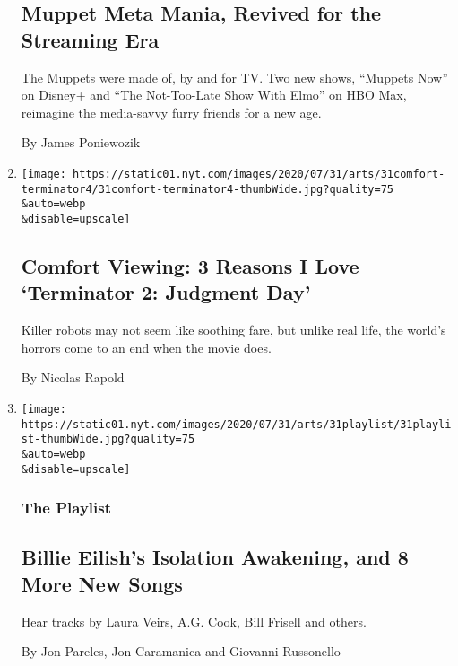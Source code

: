 \begin{enumerate}
  \hypertarget{muppet-meta-mania-revived-for-the-streaming-era}{%
  \subsection{Muppet Meta Mania, Revived for the Streaming
  Era}\label{muppet-meta-mania-revived-for-the-streaming-era}}

  The Muppets were made of, by and for TV. Two new shows, ``Muppets
  Now'' on Disney+ and ``The Not-Too-Late Show With Elmo'' on HBO Max,
  reimagine the media-savvy furry friends for a new age.

  By James Poniewozik
\item
  \href{/2020/07/31/movies/comfort-viewing-terminator-2.html}{}

  \texttt{[image: https://static01.nyt.com/images/2020/07/31/arts/31comfort-terminator4/31comfort-terminator4-thumbWide.jpg?quality=75\\\&auto=webp\\\&disable=upscale]}

  \hypertarget{comfort-viewing-3-reasons-i-love-terminator-2-judgment-day}{%
  \subsection{Comfort Viewing: 3 Reasons I Love `Terminator 2: Judgment
  Day'}\label{comfort-viewing-3-reasons-i-love-terminator-2-judgment-day}}

  Killer robots may not seem like soothing fare, but unlike real life,
  the world's horrors come to an end when the movie does.

  By Nicolas Rapold
\item
  \href{/2020/07/31/arts/music/playlist-billie-eilish-snakehips-a-boogie.html}{}

  \texttt{[image: https://static01.nyt.com/images/2020/07/31/arts/31playlist/31playlist-thumbWide.jpg?quality=75\\\&auto=webp\\\&disable=upscale]}

  \hypertarget{the-playlist}{%
  \subsubsection{The Playlist}\label{the-playlist}}

  \hypertarget{billie-eilishs-isolation-awakening-and-8-more-new-songs}{%
  \subsection{Billie Eilish's Isolation Awakening, and 8 More New
  Songs}\label{billie-eilishs-isolation-awakening-and-8-more-new-songs}}

  Hear tracks by Laura Veirs, A.G. Cook, Bill Frisell and others.

  By Jon Pareles, Jon Caramanica and Giovanni Russonello
\end{enumerate}

